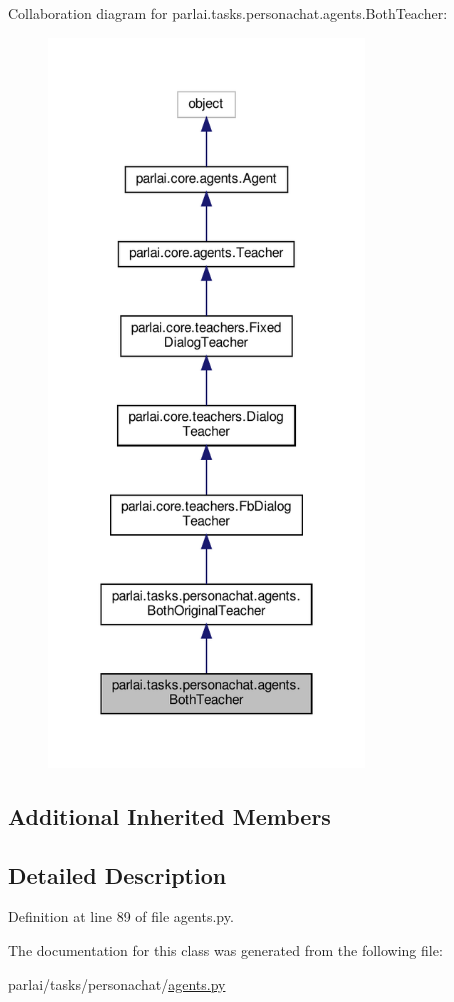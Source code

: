 Collaboration diagram for parlai.\+tasks.\+personachat.\+agents.\+Both\+Teacher\+:\nopagebreak
\begin{figure}[H]
\begin{center}
\leavevmode
\includegraphics[width=238pt]{dc/de9/classparlai_1_1tasks_1_1personachat_1_1agents_1_1BothTeacher__coll__graph}
\end{center}
\end{figure}
\subsection*{Additional Inherited Members}


\subsection{Detailed Description}


Definition at line 89 of file agents.\+py.



The documentation for this class was generated from the following file\+:\begin{DoxyCompactItemize}
\item 
parlai/tasks/personachat/\hyperlink{parlai_2tasks_2personachat_2agents_8py}{agents.\+py}\end{DoxyCompactItemize}

